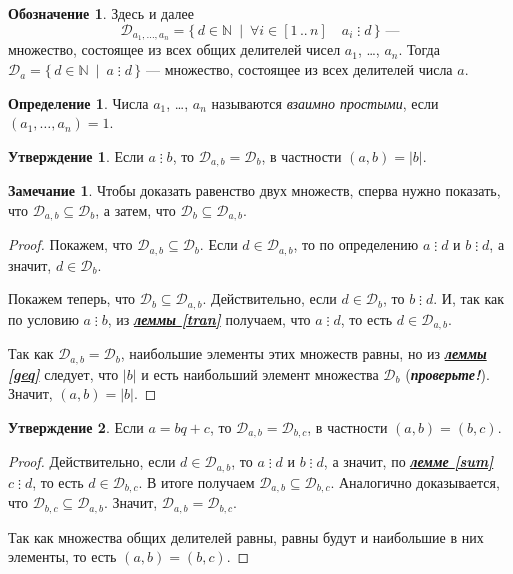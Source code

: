 \documentclass[14pt, a4paper]{extarticle}
\theoremstyle{definition}
\newtheorem*{definition}{Определение}
\newtheorem*{remark}{Замечание}
\newtheorem*{desig}{Обозначение}
\newtheorem{statement}{Утверждение}
\newcommand{\divisible}{\mathop{\vdots}}
\begin{document}
	\begin{desig}
		Здесь и далее $$\mathcal{D}_{a_1,\dots,a_n}=\{\,d\in\mathbb{N}\:\mid\:\forall i\in[1\,..\,n]\quad a_i\divisible d\,\}\text{ ---}$$ множество, состоящее из всех общих делителей чисел $a_1$, \dots, $a_n$. Тогда $\mathcal{D}_a=\{\,d\in\mathbb{N}\:\mid\:a\divisible d\,\}$ --- множество, состоящее из всех делителей числа $a$.
	\end{desig}

	\begin{definition}
		Числа $a_1$, \dots, $a_n$ называются \emph{взаимно простыми}, если $(a_1,\dots,a_n)=1$.
	\end{definition}

	\begin{statement}
	\label{nodab}
		Если $a\divisible b$, то $\mathcal{D}_{a,b}=\mathcal{D}_b$, в частности $(a,b)=|b|$.
	\end{statement}
	\begin{remark}
		Чтобы доказать равенство двух множеств, сперва нужно показать, что $\mathcal{D}_{a,b}\subseteq\mathcal{D}_b$, а затем, что $\mathcal{D}_b\subseteq\mathcal{D}_{a,b}$.
	\end{remark}
	\begin{proof}
		Покажем, что $\mathcal{D}_{a,b}\subseteq\mathcal{D}_b$. Если $d\in\mathcal{D}_{a,b}$, то по определению $a\divisible d$ и $b\divisible d$, а значит, $d\in\mathcal{D}_b$.
		
		Покажем теперь, что $\mathcal{D}_b\subseteq\mathcal{D}_{a,b}$. Действительно, если $d\in\mathcal{D}_b$, то $b\divisible d$. И, так как по условию $a\divisible b$, из \hyperref[tran]{\textbf{\textit{леммы \ref*{tran}}}} получаем, что $a\divisible d$, то есть $d\in\mathcal{D}_{a,b}$.
		
		Так как $\mathcal{D}_{a,b}=\mathcal{D}_b$, наибольшие элементы этих множеств равны, но из \hyperref[geq]{\textbf{\textit{леммы \ref*{geq}}}} следует, что $|b|$ и есть наибольший элемент множества $\mathcal{D}_b$ (\textbf{\textit{проверьте!}}). Значит, $(a,b)=|b|$.
	\end{proof}

	\begin{statement}
	\label{nodabc}
		Если $a=bq+c$, то $\mathcal{D}_{a,b}=\mathcal{D}_{b,c}$, в частности \mbox{$(a,b)=(b,c)$}.
	\end{statement}
	\begin{proof}
		Действительно, если $d\in\mathcal{D}_{a,b}$, то $a\divisible d$ и $b\divisible d$, а значит, по \hyperref[sum]{\textbf{\textit{лемме \ref*{sum}}}} $c\divisible d$, то есть $d\in\mathcal{D}_{b,c}$. В итоге получаем \mbox{$\mathcal{D}_{a,b}\subseteq\mathcal{D}_{b,c}$}. Аналогично доказывается, что $\mathcal{D}_{b,c}\subseteq\mathcal{D}_{a,b}$. Значит, $\mathcal{D}_{a,b}=\mathcal{D}_{b,c}$.
		
		Так как множества общих делителей равны, равны будут и наибольшие в них элементы, то есть $(a,b)=(b,c)$.
	\end{proof}
\end{document}
